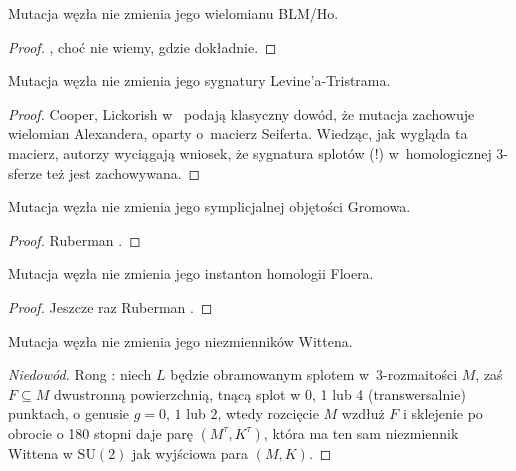 \begin{proposition}
%
    Mutacja węzła nie zmienia jego wielomianu BLM/Ho.
\end{proposition}

\begin{proof}
    \cite{tanaka2009}, choć nie wiemy, gdzie dokładnie.
\end{proof}

\begin{proposition}
%
    Mutacja węzła nie zmienia jego sygnatury Levine'a-Tristrama.
\end{proposition}

\begin{proof}
%
%
    Cooper, Lickorish w~\cite{cooper1999} podają klasyczny dowód, że mutacja zachowuje wielomian Alexandera, oparty o~macierz Seiferta.
    Wiedząc, jak wygląda ta macierz, autorzy wyciągają wniosek, że sygnatura splotów (!) w~homologicznej 3-sferze też jest zachowywana.
\end{proof}

\begin{proposition}
%
\label{mutants_the_same_volume}%
    Mutacja węzła nie zmienia jego symplicjalnej objętości Gromowa.
\end{proposition}

\begin{proof}
%
    Ruberman \cite{ruberman1987}.
\end{proof}

\begin{proposition}
%
    Mutacja węzła nie zmienia jego instanton homologii Floera.
\end{proposition}

\begin{proof}
%
    Jeszcze raz Ruberman \cite{ruberman1999}.
\end{proof}

\begin{proposition}
%
    Mutacja węzła nie zmienia jego niezmienników Wittena.
\end{proposition}

\begin{proof}[Niedowód]
    Rong \cite{rong1994}: niech $L$ będzie obramowanym splotem w~3-rozmaitości $M$, zaś $F \subseteq M$ dwustronną powierzchnią, tnącą splot w 0, 1 lub 4 (transwersalnie) punktach, o genusie $g = 0$, $1$ lub $2$, wtedy rozcięcie $M$ wzdłuż $F$ i sklejenie po obrocie o 180 stopni daje parę $(M^\tau, K^\tau)$, która ma ten sam niezmiennik Wittena w $\mathrm{SU}(2)$ jak wyjściowa para $(M, K)$.
\end{proof}

